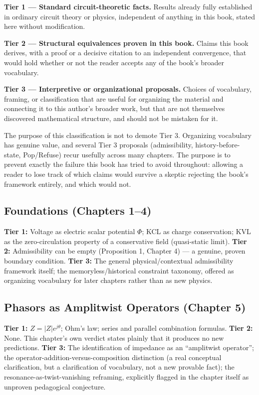 \documentclass[12pt]{article}
\begin{document}
\textbf{Tier 1 --- Standard circuit-theoretic facts.} Results already fully established in ordinary circuit theory or physics, independent of anything in this book, stated here without modification.

\textbf{Tier 2 --- Structural equivalences proven in this book.} Claims this book derives, with a proof or a decisive citation to an independent convergence, that would hold whether or not the reader accepts any of the book's broader vocabulary.

\textbf{Tier 3 --- Interpretive or organizational proposals.} Choices of vocabulary, framing, or classification that are useful for organizing the material and connecting it to this author's broader work, but that are not themselves discovered mathematical structure, and should not be mistaken for it.

The purpose of this classification is not to demote Tier 3. Organizing vocabulary has genuine value, and several Tier 3 proposals (admissibility, history-before-state, Pop/Refuse) recur usefully across many chapters. The purpose is to prevent exactly the failure this book has tried to avoid throughout: allowing a reader to lose track of which claims would survive a skeptic rejecting the book's framework entirely, and which would not.

\subsection*{Foundations (Chapters 1--4)}
\textbf{Tier 1:} Voltage as electric scalar potential $\Phi$; KCL as charge conservation; KVL as the zero-circulation property of a conservative field (quasi-static limit).
\textbf{Tier 2:} Admissibility can be empty (Proposition 1, Chapter 4) --- a genuine, proven boundary condition.
\textbf{Tier 3:} The general physical/contextual admissibility framework itself; the memoryless/historical constraint taxonomy, offered as organizing vocabulary for later chapters rather than as new physics.

\subsection*{Phasors as Amplitwist Operators (Chapter 5)}
\textbf{Tier 1:} $Z = |Z|e^{j\theta}$; Ohm's law; series and parallel combination formulas.
\textbf{Tier 2:} None. This chapter's own verdict states plainly that it produces no new predictions.
\textbf{Tier 3:} The identification of impedance as an ``amplitwist operator''; the operator-addition-versus-composition distinction (a real conceptual clarification, but a clarification of vocabulary, not a new provable fact); the resonance-as-twist-vanishing reframing, explicitly flagged in the chapter itself as unproven pedagogical conjecture.
\end{document}
